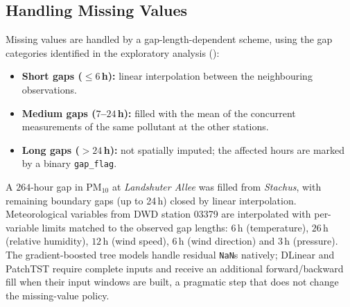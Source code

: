 \subsection{Handling Missing Values}
\label{subsection:missing-values-method}
Missing values are handled by a gap-length-dependent scheme, using the gap categories identified in the exploratory analysis ():
\begin{itemize}
    \item \textbf{Short gaps ($\le 6$\,h):} linear interpolation between the neighbouring observations.
    \item \textbf{Medium gaps ($7$--$24$\,h):} filled with the mean of the concurrent measurements of the same pollutant at the other stations.
    \item \textbf{Long gaps ($>24$\,h):} not spatially imputed; the affected hours are marked by a binary \texttt{gap\_flag}.
\end{itemize}
A $264$-hour gap in PM$_{10}$ at \textit{Landshuter Allee} was filled from \textit{Stachus}, with remaining boundary gaps (up to 24\,h) closed by linear interpolation. Meteorological variables from DWD station 03379 are interpolated with per-variable limits matched to the observed gap lengths: $6$\,h (temperature), $26$\,h (relative humidity), $12$\,h (wind speed), $6$\,h (wind direction) and $3$\,h (pressure). The gradient-boosted tree models handle residual \texttt{NaN}s natively; DLinear and PatchTST require complete inputs and receive an additional forward/backward fill when their input windows are built, a pragmatic step that does not change the missing-value policy.

